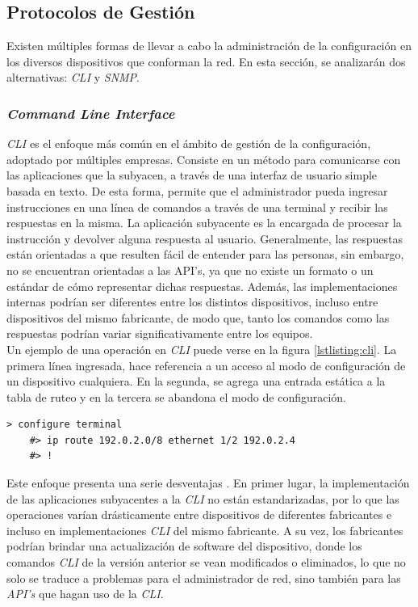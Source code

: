 \subsection{Protocolos de Gestión}
Existen múltiples formas de llevar a cabo la administración de la configuración en los diversos dispositivos que conforman la red. En esta sección, se analizarán dos alternativas: \textit{CLI} y \textit{SNMP}.

\subsubsection{\textit{Command Line Interface}}

\textit{CLI} es el enfoque más común en el ámbito de gestión de la configuración, adoptado por múltiples empresas. Consiste en un método para comunicarse con las aplicaciones que la subyacen, a través de una interfaz de usuario simple basada en texto. De esta forma, permite que el administrador pueda ingresar instrucciones en una línea de comandos a través de una terminal y recibir las respuestas en la misma. La aplicación subyacente es la encargada de procesar la instrucción y devolver alguna respuesta al usuario. Generalmente, las respuestas están orientadas a que resulten fácil de entender para las personas, sin embargo, no se encuentran orientadas a las API’s, ya que no existe un formato o un estándar de cómo representar dichas respuestas. Además, las implementaciones internas podrían ser diferentes entre los distintos dispositivos, incluso entre dispositivos del mismo fabricante, de modo que, tanto los comandos como las respuestas podrían variar significativamente entre los equipos.
\\

Un ejemplo de una operación en \textit{CLI} puede verse en la figura \ref{lstlisting:cli}. La primera línea ingresada, hace referencia a un acceso al modo de configuración de un dispositivo cualquiera. En la segunda, se agrega una entrada estática a la tabla de ruteo y en la tercera se abandona el modo de configuración.

\begin{lstlisting}[language=SHELXL, caption=Interacción típica con un dispositivo mediante \textit{CLI}., label=lstlisting:cli]
	> configure terminal
	#> ip route 192.0.2.0/8 ethernet 1/2 192.0.2.4
	#> !
\end{lstlisting}


  Este enfoque presenta una serie desventajas \parencite{clilimitacion}. En primer lugar, la implementación de las aplicaciones subyacentes a la \textit{CLI} no están estandarizadas, por lo que las operaciones varían drásticamente entre dispositivos de diferentes fabricantes e incluso en implementaciones \textit{CLI} del mismo fabricante. A su vez, los fabricantes podrían brindar una actualización de software del dispositivo, donde los comandos \textit{CLI} de la versión anterior se vean modificados o eliminados, lo que no solo se traduce a problemas para el administrador de red, sino también para las \textit{API’s} que hagan uso de la \textit{CLI}. 
  \\


